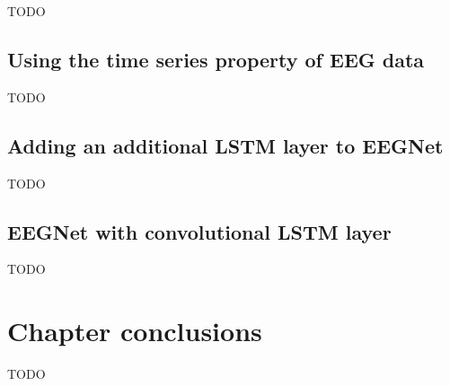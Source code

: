 TODO



\subsection{Using the time series property of EEG data}
\label{subsec:offline_bci_system_adding_memory_time_series}

TODO


\subsection{Adding an additional LSTM layer to EEGNet}
\label{subsec:offline_bci_system_adding_memory_lstm_eegnet}

TODO


\subsection{EEGNet with convolutional LSTM layer}
\label{subsec:offline_bci_system_adding_memory_convlstm_eegnet}


TODO

\section{Chapter conclusions}
\label{sec:offline_bci_summary}

TODO